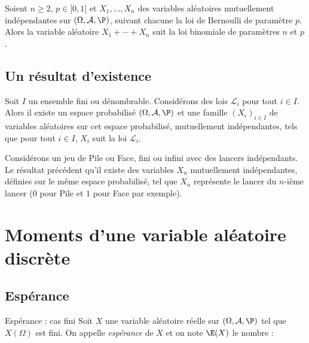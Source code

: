 \documentclass[french,11pt,twoside]{VcCours}
\begin{document}
\begin{Proposition}{} Soient $n \geq 2$, $p \in ]0,1[$ et $X_1, \ldots, X_n$ des variables aléatoires mutuellement indépendantes sur $(\Omega, \mathcal{A}, \P)$, suivant chacune la loi de Bernoulli de paramètre $p$. Alors la variable aléatoire $X_1+ \cdots + X_n$ suit la loi binomiale de paramètres $n$ et $p$.
\end{Proposition}

\begin{Demonstration}{}
\vspace*{4cm}
\end{Demonstration}

\subsection{Un résultat d'existence}

\begin{Theoreme}{} Soit $I$ un ensemble fini ou dénombrable. Considérons des lois $\mathcal{L}_i$ pour tout $i \in I$. Alors il existe un espace probabilisé $(\Omega, \mathcal{A}, \P)$ et une famille $(X_i)_{i \in I}$ de variables aléatoires sur cet espace probabilisé, mutuellement indépendantes, tels que pour tout $i \in I$, $X_i$ suit la loi $\mathcal{L}_i$.
\end{Theoreme}

\begin{Exemple}{} Considérons un jeu de Pile ou Face, fini ou infini avec des lancers indépendants. Le résultat précédent qu'il existe des variables $X_n$ mutuellement indépendantes, définies sur le même espace probabilisé, tel que $X_n$ représente le lancer du $n$-ième lancer ($0$ pour Pile et $1$ pour Face par exemple).
\end{Exemple}






\newpage
\section{Moments d'une variable aléatoire discrète}



\subsection{Espérance}


\begin{Definition}{Espérance : cas fini}
Soit $X$ une variable aléatoire réelle sur $(\Omega, \mathcal{A}, \P)$ tel que $X(\Omega)$ est fini. On appelle \emph{espérance} de $X$ et on note $\E(X)$ le nombre :
 $$ \phantom{\E (X) = \sum_{x \in X(\Omega)}x  \P\big(X=x\big)}$$
\end{Definition}
\end{document}
